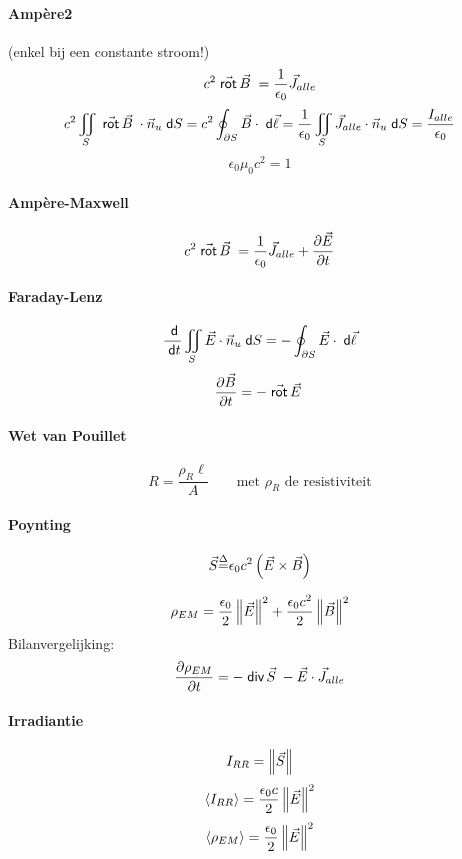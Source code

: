 \paragraph{Ampère2} (enkel bij een constante stroom!)
\[
  c^2 \;\vec{\textsf{rot}}\,\vec{B}\; = \frac{1}{\epsilon_0} \vec{J}_{alle}
\]
\[
  c^2 \iint_S \;\vec{\textsf{rot}}\,\vec{B}\; \cdot \vec{n}_u \;\textsf{d}S = c^2 \oint_{\partial S} \vec{B} \cdot \;\textsf{d}\vec{\ell}
                                                   = \frac{1}{\epsilon_0} \iint_S \vec{J}_{alle} \cdot \vec{n}_u \;\textsf{d}S
                                                   = \frac{I_{alle}}{\epsilon_0}
\]
\[
  \epsilon_0 \mu_0 c^2 = 1
\]

\paragraph{Ampère-Maxwell}
\[
  c^2 \;\vec{\textsf{rot}}\,\vec{B}\; = \frac{1}{\epsilon_0} \vec{J}_{alle} + \frac{\partial \vec{E}}{\partial t}
\]

\paragraph{Faraday-Lenz}
\[
  \frac{\;\textsf{d}}{\;\textsf{d}t} \iint_S \vec{E} \cdot \vec{n}_u \;\textsf{d}S = - \oint_{\partial S} \vec{E} \cdot \;\textsf{d}\vec{\ell}
\]
\[
  \frac{\partial \vec{B}}{\partial t} = - \;\vec{\textsf{rot}}\,\vec{E}\;
\]

\paragraph{Wet van Pouillet}
\[
  R = \frac{\rho_{R} \ell}{A} \qquad \mbox{met $\rho_R$ de resistiviteit}
\]


\paragraph{Poynting}
\[
  \vec{S} \mbox{$\stackrel{\Delta}{=}$}  \epsilon_0 c^2 \left( \vec{E} \times \vec{B} \right) 
\]

\[
  \rho_{EM} = \frac{\epsilon_0}{2} \left\| \vec{E} \right\|^2 + \frac{\epsilon_0 c^2}{2} \left\| \vec{B} \right\|^2
\]
Bilanvergelijking:
\[
  \frac{\partial \rho_{EM}}{\partial t} = - \;\textsf{div}\,\vec{S}\; - \vec{E} \cdot \vec{J}_{alle}
\]

\paragraph{Irradiantie}
\[
  I_{RR} = \left\| \vec{S} \right\|
\]
\[
  \left\langle I_{RR}\right\rangle = \frac{\epsilon_0 c}{2} \left\| \vec{E} \right\|^2
\]
\[
  \left\langle \rho_{EM}\right\rangle = \frac{\epsilon_0}{2} \left\| \vec{E} \right\|^2
\]
